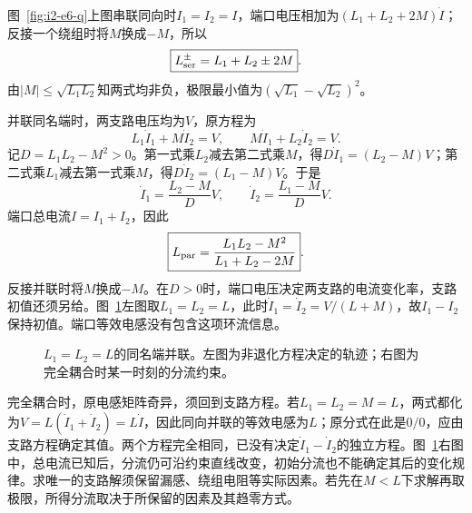 \begin{solution}
图~\ref{fig:i2-e6-q}上图串联同向时$I_1=I_2=I$，端口电压相加为$(L_1+L_2+2M)\dot I$；反接一个绕组时将$M$换成$-M$，所以
\[\boxed{L_{\rm ser}^{\pm}=L_1+L_2\pm2M}.
\]
由$|M|\le\sqrt{L_1L_2}$知两式均非负，极限最小值为$(\sqrt{L_1}-\sqrt{L_2})^2$。

并联同名端时，两支路电压均为$V$，原方程为
\[L_1\dot I_1+M\dot I_2=V,\qquad
M\dot I_1+L_2\dot I_2=V.\]
记$D=L_1L_2-M^2>0$。第一式乘$L_2$减去第二式乘$M$，得$D\dot I_1=(L_2-M)V$；第二式乘$L_1$减去第一式乘$M$，得$D\dot I_2=(L_1-M)V$。于是
\[\dot I_1=\frac{L_2-M}{D}V,\qquad
\dot I_2=\frac{L_1-M}{D}V.
\]
端口总电流$I=I_1+I_2$，因此
\[\boxed{L_{\rm par}=\frac{L_1L_2-M^2}{L_1+L_2-2M}}.
\]
反接并联时将$M$换成$-M$。在$D>0$时，端口电压决定两支路的电流变化率，支路初值还须另给。图~\ref{fig:i2-e6-s}左图取$L_1=L_2=L$，此时$\dot I_1=\dot I_2=V/(L+M)$，故$I_1-I_2$保持初值。端口等效电感没有包含这项环流信息。


\begin{figure}[H]\centering
{}
\caption{$L_1=L_2=L$的同名端并联。左图为非退化方程决定的轨迹；右图为完全耦合时某一时刻的分流约束。}\label{fig:i2-e6-s}
\end{figure}

完全耦合时，原电感矩阵奇异，须回到支路方程。若$L_1=L_2=M=L$，两式都化为$V=L(\dot I_1+\dot I_2)=L\dot I$，因此同向并联的等效电感为$L$；原分式在此是$0/0$，应由支路方程确定其值。两个方程完全相同，已没有决定$\dot I_1-\dot I_2$的独立方程。图~\ref{fig:i2-e6-s}右图中，总电流已知后，分流仍可沿约束直线改变，初始分流也不能确定其后的变化规律。求唯一的支路解须保留漏感、绕组电阻等实际因素。若先在$M<L$下求解再取极限，所得分流取决于所保留的因素及其趋零方式。


\end{solution}
